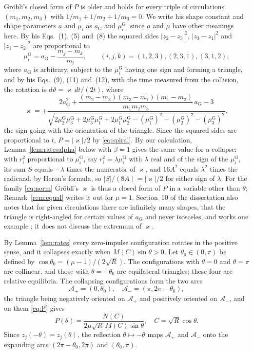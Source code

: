 \documentclass[11pt]{article}
\theoremstyle{definition}
\newcommand{\Ap}{\mathcal{A}_+}
\newcommand{\Am}{\mathcal{A}_-}
\begin{document}
Gr\"obli's closed form of $P$ \cite[\S~10, pp.~55--59]{grobli1877} is older and holds for every triple of circulations $(m_1, m_2, m_3)$ with $1/m_1 + 1/m_2 + 1/m_3 = 0$. We write his shape constant and shape parameters $a$ and $\mu_i$ as $a_{\mathrm G}$ and $\mu^{\mathrm G}_i$, since $a$ and $\mu$ have other meanings here. By his Eqs.~(1), (5) and~(8) the squared sides $|z_2 - z_3|^2$, $|z_3 - z_1|^2$ and $|z_1 - z_2|^2$ are proportional to
\[
  \mu^{\mathrm G}_i = a_{\mathrm G} - \frac{m_j - m_k}{m_i}, \qquad (i, j, k) = (1, 2, 3), (2, 3, 1), (3, 1, 2),
\]
where $a_{\mathrm G}$ is arbitrary, subject to the $\mu^{\mathrm G}_i$ having one sign and forming a triangle, and by his Eqs.~(9), (11) and~(12), with the time measured from the collision, the rotation is $d\vartheta = \varkappa\,dt/(2t)$, where
\[
  \varkappa = \pm\frac{2a_{\mathrm G}^2 + \dfrac{(m_2 - m_3)(m_3 - m_1)(m_1 - m_2)}{m_1 m_2 m_3}\,a_{\mathrm G} - 3}{\sqrt{2\mu^{\mathrm G}_2\mu^{\mathrm G}_3 + 2\mu^{\mathrm G}_3\mu^{\mathrm G}_1 + 2\mu^{\mathrm G}_1\mu^{\mathrm G}_2 - (\mu^{\mathrm G}_1)^2 - (\mu^{\mathrm G}_2)^2 - (\mu^{\mathrm G}_3)^2}},
\]
the sign going with the orientation of the triangle. Since the squared sides are proportional to $t$, $P = |\varkappa|/2$ by \eqref{eq:spiral}. By our calculation, Lemma~\ref{lem:ratesalpha} below with $\beta = 1$ gives the same value for a collapse: with $r_i^2$ proportional to $\mu^{\mathrm G}_i$, say $r_i^2 = \lambda\mu^{\mathrm G}_i$ with $\lambda$ real and of the sign of the $\mu^{\mathrm G}_i$, its sum $S$ equals $-\lambda$ times the numerator of $\varkappa$, and $16A^2$ equals $\lambda^2$ times the radicand, by Heron's formula, so $|S|/(8A) = |\varkappa|/2$ for either sign of $\lambda$. For the family \eqref{eq:norm} Gr\"obli's $\varkappa$ is thus a closed form of $P$ in a variable other than $\theta$; Remark~\ref{rem:equal} writes it out for $\mu = 1$. Section~10 of the dissertation also notes that for given circulations there are infinitely many shapes, that the triangle is right-angled for certain values of $a_{\mathrm G}$ and never isosceles, and works one example \cite[p.~59, Fig.~6]{grobli1877}; it does not discuss the extremum of $\varkappa$.

By Lemma~\ref{lem:rates} every zero-impulse configuration rotates in the positive sense, and it collapses exactly when $M(C) \sin\theta > 0$. Let $\theta_0 \in (0, \pi)$ be defined by $\cos\theta_0 = (\mu - 1)/(2\sqrt{R})$. The configurations with $\theta = 0$ and $\theta = \pi$ are collinear, and those with $\theta = \pm\theta_0$ are equilateral triangles; these four are relative equilibria. The collapsing configurations form the two arcs
\[
  \Ap = (0, \theta_0), \quad \Am = (\pi, 2\pi - \theta_0),
\]
the triangle being negatively oriented on $\Ap$ and positively oriented on $\Am$, and on them \eqref{eq:P} gives
\begin{equation}\label{eq:Ptheta}
  P(\theta) = \frac{N(C)}{2\mu\sqrt{R}\, M(C) \sin\theta}, \quad C = \sqrt{R}\cos\theta.
\end{equation}
Since $z_j(-\theta) = \overline{z_j(\theta)}$, the reflection $\theta \mapsto -\theta$ maps $\Ap$ and $\Am$ onto the expanding arcs $(2\pi - \theta_0, 2\pi)$ and $(\theta_0, \pi)$.
\end{document}

